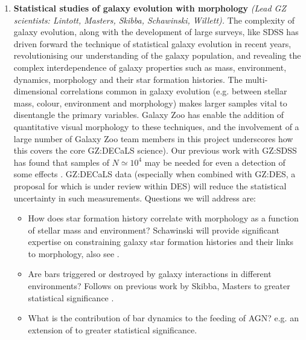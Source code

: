 \documentclass[iop,apj,tighten]{emulateapj}
\begin{document}
\begin{enumerate}
    \item \textbf{Statistical studies of galaxy evolution with morphology} \textit{ (Lead GZ scientists: Lintott, Masters, Skibba, Schawinski, Willett).} The complexity of galaxy evolution, along with the development of large surveys, like SDSS has driven forward the technique of statistical galaxy evolution in recent years, revolutionising our understanding of the galaxy population, and revealing the complex interdependence of galaxy properties such as mass, environment, dynamics, morphology and their star formation histories. The multi-dimensional correlations common in galaxy evolution (e.g. between stellar mass, colour, environment and morphology) makes larger samples vital to disentangle the primary variables. Galaxy Zoo has enable the addition of quantitative visual morphology to these techniques, and the involvement of a large number of Galaxy Zoo team members in this project underscores how this covers the core GZ:DECaLS science). Our previous work with GZ:SDSS has found that samples of $N\simeq10^4$ may be needed for even a detection of some effects \citep{ski12}. GZ:DECaLS data (especially when combined with GZ:DES, a proposal for which is under review within DES) will reduce the statistical uncertainty in such measurements. Questions we will address are:
    \begin{itemize}
        \item How does star formation history correlate with morphology as a function of stellar mass and environment? Schawinski will provide significant expertise on constraining galaxy star formation histories and their links to morphology, also see \citet{sme15}.
        \item Are bars triggered or destroyed by galaxy interactions in different environments? Follows on previous work by Skibba, Masters to greater statistical significance \citep{ski12,mas11c,mas12a}.
        \item What is the contribution of bar dynamics to the feeding of AGN? e.g. an extension of \citet{gal15} to greater statistical significance.
    \end{itemize}

\end{enumerate}
\end{document}
